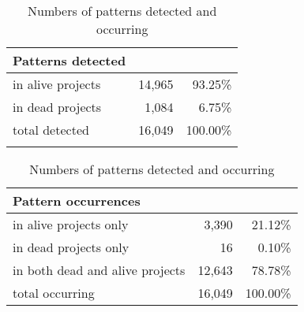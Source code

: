 \begin{table}[H]
\caption{Numbers of patterns detected and occurring}\label{table:pattern_counts}
\centering
\begin{tabular}{lrr}
\hline
	\bfseries{Patterns detected}\rm \\
	\hline
	in alive projects & 14,965 & 93.25\% \\
	in dead projects & 1,084 & 6.75\% \\
	\hline
	total detected & 16,049 & 100.00\% \\
	\hline \\
\end{tabular}
\hspace{1em}
\begin{tabular}{lrr}
\hline
	\bfseries{Pattern occurrences}\rm \\
	\hline
	in alive projects only & 3,390 & 21.12\% \\
	in dead projects only & 16 & 0.10\% \\
	in both dead and alive projects & 12,643 & 78.78\% \\
	\hline
	total occurring & 16,049 & 100.00\% \\
\hline
\end{tabular}
\end{table}